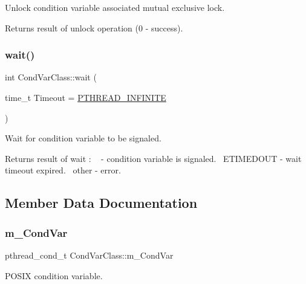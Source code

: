 Unlock condition variable associated mutual exclusive lock. \begin{DoxyReturn}{Returns}
result of unlock operation (0 -\/ success). 
\end{DoxyReturn}
\mbox{\label{classCondVarClass_a7d8ef7832aff2cb2b4a627beb4707c6b}} 
\subsubsection{\texorpdfstring{wait()}{wait()}}
{\footnotesize\ttfamily int Cond\+Var\+Class\+::wait (\begin{DoxyParamCaption}\item[{time\+\_\+t}]{Timeout = {\ttfamily \hyperlink{PThreadClassLib_8h_a9d2d74d73cb5d069fbfcbcfebf42bd6e}{P\+T\+H\+R\+E\+A\+D\+\_\+\+I\+N\+F\+I\+N\+I\+TE}} }\end{DoxyParamCaption})}

Wait for condition variable to be signaled. \begin{DoxyReturn}{Returns}
result of wait \+: ~ -\/ condition variable is signaled.~\newline
 E\+T\+I\+M\+E\+D\+O\+UT -\/ wait timeout expired.~\newline
 other -\/ error. 
\end{DoxyReturn}


\subsection{Member Data Documentation}
\mbox{\label{classCondVarClass_ae74b5148e366723b2124aed2c3181d83}} 
\subsubsection{\texorpdfstring{m\+\_\+\+Cond\+Var}{m\_CondVar}}
{\footnotesize\ttfamily pthread\+\_\+cond\+\_\+t Cond\+Var\+Class\+::m\+\_\+\+Cond\+Var\hspace{0.3cm}{\ttfamily [protected]}}



P\+O\+S\+IX condition variable. 

